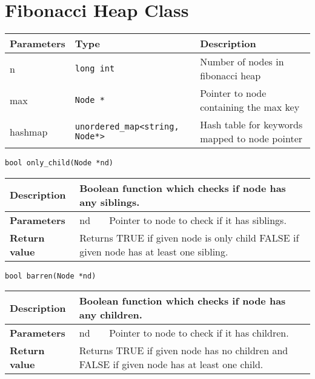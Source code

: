 \documentclass[12pt, reqno]{amsart}
\begin{document}
\newpage
\section*{Fibonacci Heap Class}

\begin{center}
    \begin{tabular}{| l | l | p{6.8cm} |}
    \hline
    {\bfseries Parameters} & {\bfseries Type} & {\bfseries Description} \\ \hline
    n & \texttt{long int} & Number of nodes in fibonacci heap \\ \hline
    max & \texttt{Node *} & Pointer to node containing the max key \\ \hline
    hashmap & \texttt{unordered\_map<string, Node*>} & Hash table for keywords mapped to node pointer \\ \hline
    \end{tabular}
\end{center}
\vspace{2mm}


{\large \texttt{bool only\_child(Node *nd)}}
\begin{center}
    \begin{tabular}{| l | p{2.5cm} | p{9.5cm} |}
    \hline
    {\bfseries Description} & \multicolumn{2}{p{12.5cm}|}{Boolean function which checks if node has any siblings.} \\ \hline
    \multirow{1}{*}{\bfseries Parameters} & nd & Pointer to node to check if it has siblings. \\ \hline
    {\bfseries Return value} & \multicolumn{2}{p{12.5cm}|}{Returns TRUE if given node is only child FALSE if given node has at least one sibling.} \\ \hline
    \end{tabular}
\end{center}    

{\large \texttt{bool barren(Node *nd)}}
\begin{center}
    \begin{tabular}{| l | p{2.5cm} | p{9.5cm} |}
    \hline
    {\bfseries Description} & \multicolumn{2}{p{12.5cm}|}{Boolean function which checks if node has any children.} \\ \hline
    \multirow{1}{*}{\bfseries Parameters} & nd & Pointer to node to check if it has children. \\ \hline
    {\bfseries Return value} & \multicolumn{2}{p{12.5cm}|}{Returns TRUE if given node has no children and FALSE if given node has at least one child.} \\ \hline
    \end{tabular}
\end{center}    
\end{document}
